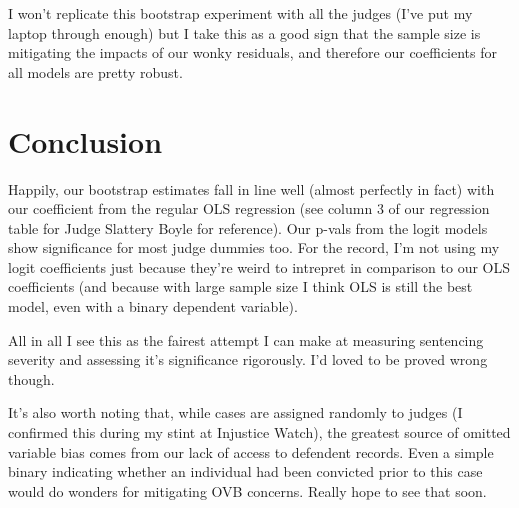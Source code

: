 \documentclass[
]{article}
\begin{document}
I won't replicate this bootstrap experiment with all the judges (I've
put my laptop through enough) but I take this as a good sign that the
sample size is mitigating the impacts of our wonky residuals, and
therefore our coefficients for all models are pretty robust.

\hypertarget{conclusion}{%
\section{Conclusion}\label{conclusion}}

Happily, our bootstrap estimates fall in line well (almost perfectly in
fact) with our coefficient from the regular OLS regression (see column 3
of our regression table for Judge Slattery Boyle for reference). Our
p-vals from the logit models show significance for most judge dummies
too. For the record, I'm not using my logit coefficients just because
they're weird to intrepret in comparison to our OLS coefficients (and
because with large sample size I think OLS is still the best model, even
with a binary dependent variable).

All in all I see this as the fairest attempt I can make at measuring
sentencing severity and assessing it's significance rigorously. I'd
loved to be proved wrong though.

It's also worth noting that, while cases are assigned randomly to judges
(I confirmed this during my stint at Injustice Watch), the greatest
source of omitted variable bias comes from our lack of access to
defendent records. Even a simple binary indicating whether an individual
had been convicted prior to this case would do wonders for mitigating
OVB concerns. Really hope to see that soon.
\end{document}
